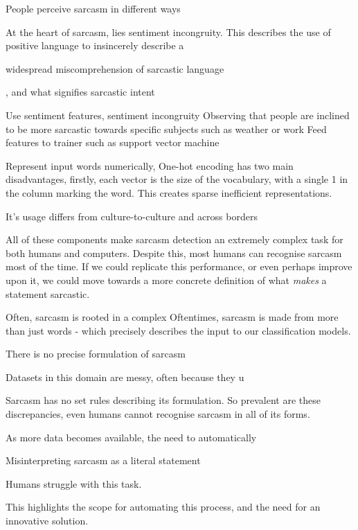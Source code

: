 \documentclass[12pt,a4paper]{article}
\begin{document}
People perceive sarcasm in different ways

At the heart of sarcasm, lies sentiment incongruity. This describes the use of positive language to insincerely describe a 

widespread miscomprehension of sarcastic language


, and what signifies sarcastic intent


Use sentiment features, sentiment incongruity
Observing that people are inclined to be more sarcastic towards specific subjects such as weather or work
Feed features to trainer such as support vector machine

Represent input words numerically, 
One-hot encoding has two main disadvantages, firstly, each vector is the size of the vocabulary, with a single 1 in the column marking the word. This creates sparse inefficient representations.



 It's usage differs from culture-to-culture and across borders



All of these components make sarcasm detection an extremely complex task for both humans and computers. Despite this, most humans can recognise sarcasm most of the time. If we could replicate this performance, or even perhaps improve upon it, we could move towards a more concrete definition of what \textit{makes} a statement sarcastic.

Often, sarcasm is rooted in a complex 
Oftentimes, sarcasm is made from more than just words - which precisely describes the input to our classification models.


There is no precise formulation of sarcasm

Datasets in this domain are messy, often because they u

Sarcasm has no set rules describing its formulation. So prevalent are these  discrepancies, even humans cannot recognise sarcasm in all of its forms.


As more data becomes available, the need to automatically 

Misinterpreting sarcasm as a literal statement 

Humans struggle with this task. 

This highlights the scope for automating this process, and the need for an innovative solution.\\
\\
\end{document}
